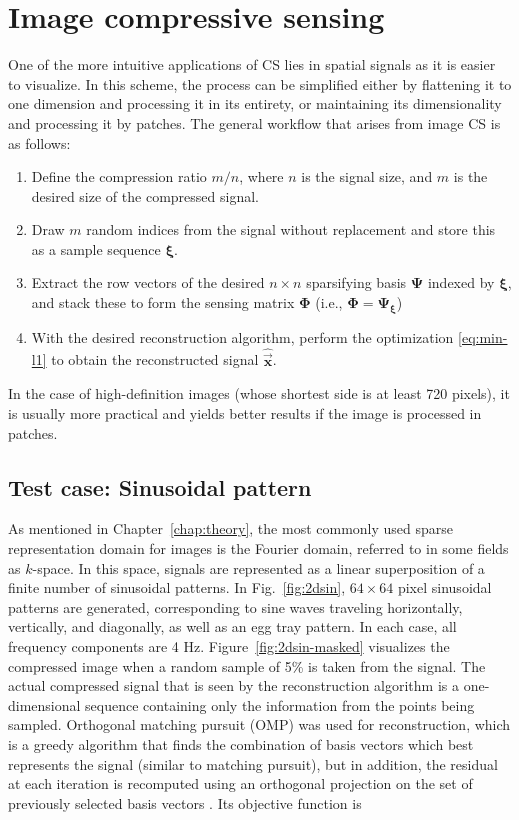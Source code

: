 \chapter{Image compressive sensing}
\label{chap:image-cs}


One of the more intuitive applications of CS lies in spatial signals as it is easier to visualize. In this scheme, the process can be simplified either by flattening it to one dimension and processing it in its entirety, or maintaining its dimensionality and processing it by patches. The general workflow that arises from image CS is as follows:

\begin{enumerate}
	\item Define the compression ratio $m/n$, where $n$ is the signal size, and $m$ is the desired size of the compressed signal.
	\item Draw $m$ random indices from the signal without replacement and store this as a sample sequence $\bm\xi$.
	\item Extract the row vectors of the desired $n \times n$ sparsifying basis $\bm\Psi$ indexed by $\bm\xi$, and stack these to form the sensing matrix $\bm\Phi$ (i.e., $\bm\Phi = \bm\Psi_{\bm\xi}$)
	\item With the desired reconstruction algorithm, perform the optimization \eqref{eq:min-l1} to obtain the reconstructed signal $\bm\hat{\vec{x}}$.
\end{enumerate}

In the case of high-definition images (whose shortest side is at least 720 pixels), it is usually more practical and yields better results if the image is processed in patches.


\section{Test case: Sinusoidal pattern}
\label{sec:2dsin}
As mentioned in Chapter~\ref{chap:theory}, the most commonly used sparse representation domain for images is the Fourier domain, referred to in some fields as $k$-space. In this space, signals are represented as a linear superposition of a finite number of sinusoidal patterns. In Fig.~\ref{fig:2dsin}, $64 \times 64$ pixel sinusoidal patterns are generated, corresponding to sine waves traveling horizontally, vertically, and diagonally, as well as an egg tray pattern. In each case, all frequency components are 4 Hz. Figure~\ref{fig:2dsin-masked} visualizes the compressed image when a random sample of 5\% is taken from the signal. The actual compressed signal that is seen by the reconstruction algorithm is a one-dimensional sequence containing only the information from the points being sampled. Orthogonal matching pursuit (OMP) was used for reconstruction, which is a greedy algorithm that finds the combination of basis vectors which best represents the signal (similar to matching pursuit), but in addition, the residual at each iteration is recomputed using an orthogonal projection on the set of previously selected basis vectors \cite{Mallat1993}. Its objective function is


